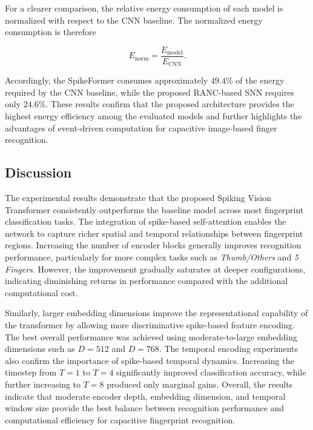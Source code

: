 \documentclass[../main.tex]{subfiles}
\begin{document}
For a clearer comparison, the relative energy consumption of each model is
normalized with respect to the CNN baseline. The normalized energy consumption
is therefore

\begin{equation}
E_{\mathrm{norm}}
=
\frac{E_{\mathrm{model}}}
{E_{\mathrm{CNN}}}.
\end{equation}

Accordingly, the SpikeFormer consumes approximately $49.4\%$ of the energy
required by the CNN baseline, while the proposed RANC-based SNN requires only
$24.6\%$. These results confirm that the proposed architecture provides the
highest energy efficiency among the evaluated models and further highlights the
advantages of event-driven computation for capacitive image-based finger
recognition.


\subsection{Discussion}

The experimental results demonstrate that the proposed Spiking Vision Transformer consistently outperforms the baseline model across most fingerprint classification tasks. The integration of spike-based self-attention enables the network to capture richer spatial and temporal relationships between fingerprint regions. Increasing the number of encoder blocks generally improves recognition performance, particularly for more complex tasks such as \textit{Thumb/Others} and \textit{5 Fingers}. However, the improvement gradually saturates at deeper configurations, indicating diminishing returns in performance compared with the additional computational cost.

Similarly, larger embedding dimensions improve the representational capability of the transformer by allowing more discriminative spike-based feature encoding. The best overall performance was achieved using moderate-to-large embedding dimensions such as \(D=512\) and \(D=768\). The temporal encoding experiments also confirm the importance of spike-based temporal dynamics. Increasing the timestep from \(T=1\) to \(T=4\) significantly improved classification accuracy, while further increasing to \(T=8\) produced only marginal gains. Overall, the results indicate that moderate encoder depth, embedding dimension, and temporal window size provide the best balance between recognition performance and computational efficiency for capacitive fingerprint recognition.
\end{document}
